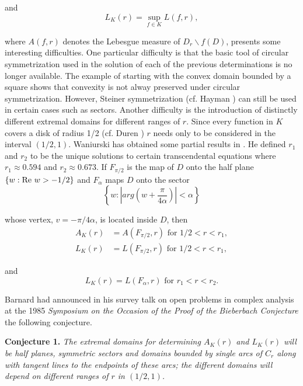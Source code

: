 \documentclass[final]{siamltex}
\begin{document}
\noindent and
\begin{equation*}
L_K(r) = \sup_{f \in K} L(f,r), 
\end{equation*}

\noindent where $A(f,r)$ denotes the Lebesgue measure of $D_r \backslash f(D)$, presents some interesting difficulties.
One particular difficulty is that the basic tool of circular symmetrization used in the solution of each of the previous
determinations is no longer available.  The example of starting with the convex domain bounded by a square shows that 
convexity is not alway preserved under circular symmetrization.  However, Steiner symmetrization (cf. Hayman \cite{Hayman1})
can still be used in certain cases such as sectors.  Another difficulty is the introduction of distinctly different extremal
domains for different ranges of $r$.  Since every function in $K$ covers a disk of radius 1/2 (cf. Duren \cite{Duren1})
$r$ needs only to be considered in the interval $(1/2,1)$.  Waniurski has obtained some partial results in \cite{Waniurski1}.
He defined $r_1$ and $r_2$ to be the unique solutions to certain transcendental equations where $r_1 \approx 0.594$ and $r_2 \approx 0.673$.
If $F_{\pi/2}$ is the map of $D$ onto the half plane $\{ w : {\rm Re} \  w > -1/2 \}$ and $F_\alpha$ maps $D$ onto the sector
$$\left \{ w : \left | arg \left ( w + \frac{\pi}{4\alpha} \right ) \right | < \alpha \right \}$$

\noindent whose vertex, $v = - \pi/4\alpha$, is located inside $D$, then
\begin{align*}
A_K(r) &= A(F_{\pi/2},r) \mbox{ for } 1/2 < r < r_1, \\
L_K(r) &= L(F_{\pi/2},r) \mbox{ for } 1/2 < r < r_1,
\end{align*} 

\noindent and
$$L_K(r) = L(F_\alpha,r) \mbox { for } r_1 < r < r_2.$$

Barnard had announced in his survey talk on open problems in complex analysis at the 1985 {\em Symposium on the Occasion of the 
Proof of the Bieberbach Conjecture} the following conjecture.

\vspace{0.1in}

{\bf Conjecture 1.} {\em The extremal domains for determining $A_K(r)$ and $L_K(r)$ will be half planes, symmetric sectors and domains bounded by single arcs of $C_r$ along with tangent lines to the endpoints of these arcs; the different domains will depend on different ranges of $r$ in $(1/2,1)$.}
\end{document}
